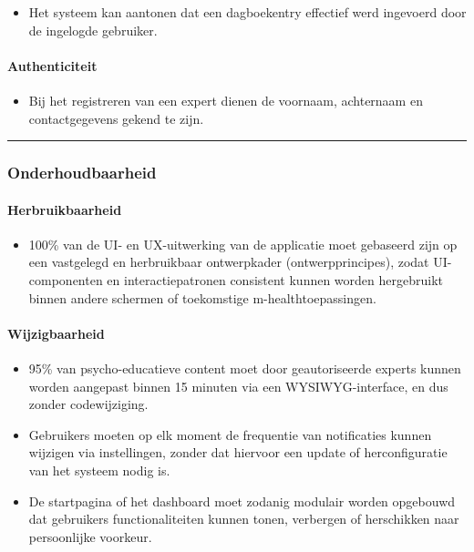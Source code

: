 \begin{itemize}
    \item Het systeem kan aantonen dat een dagboekentry effectief werd ingevoerd door de ingelogde gebruiker.
\end{itemize}

\paragraph{Authenticiteit}
\vspace{1em}

\begin{itemize}
    \item Bij het registreren van een expert dienen de voornaam, achternaam en contactgegevens gekend te zijn.
\end{itemize}

\vspace{1em}
\vspace{1em}
\hrule
\vspace{1em}

\subsubsection{Onderhoudbaarheid}
\label{subsubsec:onderhoudbaarheid}

\vspace{1em}

\paragraph{Herbruikbaarheid}
\vspace{1em}

\begin{itemize}
    \item 100\% van de UI- en UX-uitwerking van de applicatie moet gebaseerd zijn op een vastgelegd en herbruikbaar ontwerpkader (ontwerpprincipes), zodat UI-componenten en interactiepatronen consistent kunnen worden hergebruikt binnen andere schermen of toekomstige m-healthtoepassingen.
\end{itemize}

\paragraph{Wijzigbaarheid}
\vspace{1em}

\begin{itemize}
    \item 95\% van psycho-educatieve content moet door geautoriseerde experts kunnen worden aangepast binnen 15 minuten via een WYSIWYG-interface, en dus zonder codewijziging.
    \item Gebruikers moeten op elk moment de frequentie van notificaties kunnen wijzigen via instellingen, zonder dat hiervoor een update of herconfiguratie van het systeem nodig is.
    \item De startpagina of het dashboard moet zodanig modulair worden opgebouwd dat gebruikers functionaliteiten kunnen tonen, verbergen of herschikken naar persoonlijke voorkeur.
\end{itemize}

